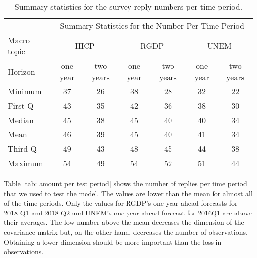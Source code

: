 \documentclass[11pt]{article}
\begin{document}
	\begin{table}[!h]
		\centering
		\caption{Summary statistics for the survey reply numbers per time period.}
		\label{tab: time summary statistics}
		\begin{tabular}{lcccccc}%
			\hline
			&\multicolumn{6}{c}{Summary Statistics for the Number Per Time Period}\\
			\cmidrule(lr){2-7}
			Macro topic & \multicolumn{2}{c}{HICP} & \multicolumn{2}{c}{RGDP} & \multicolumn{2}{c}{UNEM} \\
			\cmidrule(lr){2-3} \cmidrule(lr){4-5}\cmidrule(lr){6-7}
			Horizon     & one year & two years & one year & two years & one year & two years \\ 
			\hline
			Minimum & 37    & 26    & 38    & 28    & 32    & 22    \\
			First Q & 43    & 35    & 42    & 36    & 38    & 30    \\
			Median  & 45    & 38    & 45    & 40    & 40    & 34    \\
			Mean    & 46    & 39    & 45    & 40    & 41    & 34    \\
			Third Q & 49    & 43    & 48    & 45    & 44    & 38    \\
			Maximum & 54    & 49    & 54    & 52    & 51    & 44       \\ 
			\hline
		\end{tabular}
	\end{table}
	
	Table \ref{tab: amount per test period} shows the number of replies per time period that we used to test the model. The values are lower than the mean for almost all of the time periods. Only the values for RGDP's one-year-ahead forecasts for 2018 Q1 and 2018 Q2 and UNEM's one-year-ahead forecast for 2016Q1 are above their averages. The low number above the mean decreases the dimension of the covariance matrix but, on the other hand, decreases the number of observations. Obtaining a lower dimension should be more important than the loss in observations.
	
\end{document}
